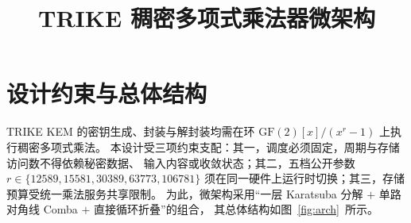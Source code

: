 \documentclass{article}
\title{TRIKE 稠密多项式乘法器微架构}
\author{}
\date{}
\begin{document}
\maketitle

\section{设计约束与总体结构}

TRIKE KEM 的密钥生成、封装与解封装均需在环 $\mathrm{GF}(2)[x]/(x^r-1)$ 上执行稠密多项式乘法。
本设计受三项约束支配：其一，调度必须固定，周期与存储访问数不得依赖秘密数据、
输入内容或收敛状态；其二，五档公开参数 $r\in\{12589,15581,30389,63773,106781\}$
须在同一硬件上运行时切换；其三，存储预算受统一乘法服务共享限制。
为此，微架构采用``一层 Karatsuba 分解 $+$ 单路对角线 Comba $+$ 直接循环折叠''的组合，
其总体结构如图~\ref{fig:arch}~所示。
\end{document}
